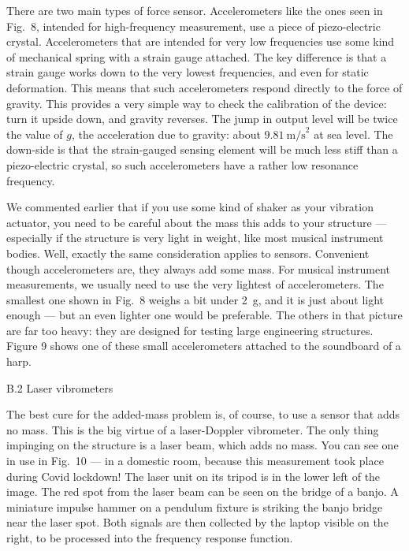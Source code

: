   There are two main types of force sensor. Accelerometers like the ones seen 
  in Fig.\ 8, intended for high-frequency measurement, use a piece of 
  piezo-electric crystal. Accelerometers that are intended for very low 
  frequencies use some kind of mechanical spring with a strain gauge attached. 
  The key difference is that a strain gauge works down to the very lowest 
  frequencies, and even for static deformation. This means that such 
  accelerometers respond directly to the force of gravity. This provides a very 
  simple way to check the calibration of the device: turn it upside down, and 
  gravity reverses. The jump in output level will be twice the value of $g$, 
  the acceleration due to gravity: about $9.81\mathrm{~m/s}^2$ at sea level. 
  The down-side is that the strain-gauged sensing element will be much less 
  stiff than a piezo-electric crystal, so such accelerometers have a rather low 
  resonance frequency. 

  We commented earlier that if you use some kind of shaker as your vibration 
  actuator, you need to be careful about the mass this adds to your structure — 
  especially if the structure is very light in weight, like most musical 
  instrument bodies. Well, exactly the same consideration applies to sensors. 
  Convenient though accelerometers are, they always add some mass. For musical 
  instrument measurements, we usually need to use the very lightest of 
  accelerometers. The smallest one shown in Fig.\ 8 weighs a bit under 2~g, and 
  it is just about light enough --- but an even lighter one would be 
  preferable. The others in that picture are far too heavy: they are designed 
  for testing large engineering structures. Figure 9 shows one of these small 
  accelerometers attached to the soundboard of a harp. 

  B.2 Laser vibrometers 

  The best cure for the added-mass problem is, of course, to use a sensor that 
  adds no mass. This is the big virtue of a laser-Doppler vibrometer. The only 
  thing impinging on the structure is a laser beam, which adds no mass. You can 
  see one in use in Fig.\ 10 — in a domestic room, because this measurement 
  took place during Covid lockdown! The laser unit on its tripod is in the 
  lower left of the image. The red spot from the laser beam can be seen on the 
  bridge of a banjo. A miniature impulse hammer on a pendulum fixture is 
  striking the banjo bridge near the laser spot. Both signals are then 
  collected by the laptop visible on the right, to be processed into the 
  frequency response function. 

